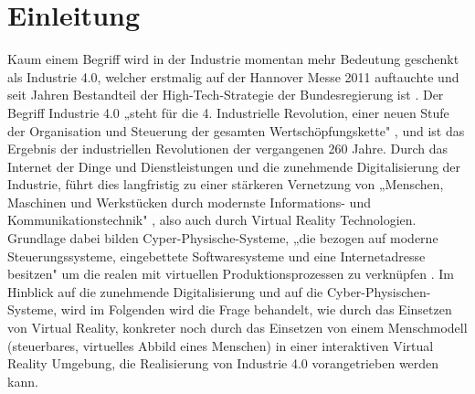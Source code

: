 \chapter{Einleitung} \label{cha:Einleitung}	

Kaum einem Begriff wird in der Industrie momentan mehr Bedeutung geschenkt als Industrie 4.0, welcher erstmalig auf der Hannover Messe 2011 auftauchte und seit Jahren Bestandteil der High-Tech-Strategie der Bundesregierung ist \cite{8}. Der Begriff Industrie 4.0 „steht für die 4. Industrielle Revolution, einer neuen Stufe der Organisation und Steuerung der gesamten Wertschöpfungskette" \cite{1} , und ist das Ergebnis der industriellen Revolutionen der vergangenen 260 Jahre. Durch das Internet der Dinge und Dienstleistungen und die zunehmende Digitalisierung der Industrie, führt dies langfristig zu einer stärkeren Vernetzung von „Menschen, Maschinen und Werkstücken durch modernste Informations- und Kommunikationstechnik" \cite{6}, also auch durch Virtual Reality Technologien. Grundlage dabei bilden Cyper-Physische-Systeme, „die bezogen auf moderne Steuerungssysteme, eingebettete Softwaresysteme und eine Internetadresse besitzen" \cite{1} um die realen mit virtuellen Produktionsprozessen zu verknüpfen \cite{11}.
\newline
Im Hinblick auf die zunehmende Digitalisierung und auf die Cyber-Physischen-Systeme, wird im Folgenden wird die Frage behandelt, wie durch das Einsetzen von Virtual Reality, konkreter noch durch das Einsetzen von einem Menschmodell (steuerbares, virtuelles Abbild eines Menschen) in einer interaktiven Virtual Reality Umgebung, die Realisierung von Industrie 4.0 vorangetrieben werden kann.

